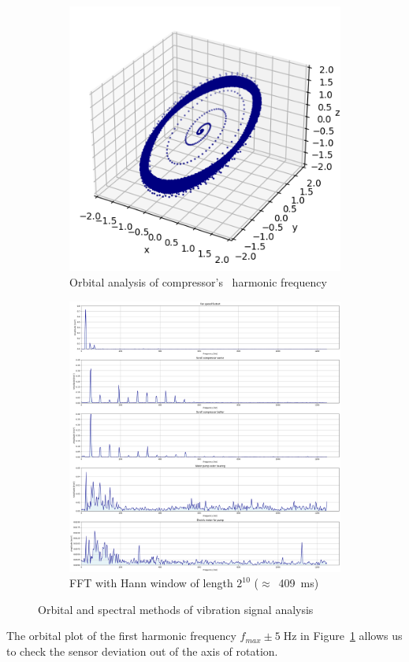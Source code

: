 \begin{figure}[h]
    \centering
    \begin{subfigure}[b]{0.45\textwidth}
        \includegraphics[width=\textwidth]{assets/design/compressor-orbitals-1x.png}
		\caption{Orbital analysis of compressor's ~harmonic frequency}
		\label{fig:design:orbital-analysis}
    \end{subfigure}
    \hfill
    \begin{subfigure}[b]{0.54\textwidth}
        \includegraphics[width=\textwidth]{assets/design/EDA-custom-dataset-spectral-X-axis.png}
        \caption{FFT with Hann window of length $2^{10}$ ($\approx$~409~ms)}
        \label{fig:design:preliminary-spectrum}
    \end{subfigure} 
    \caption{Orbital and spectral methods of vibration signal analysis}
\end{figure}

The orbital plot of the first harmonic frequency $f_{max} \pm 5\;\mathrm{Hz}$ in Figure~\ref{fig:design:orbital-analysis} allows us to check the sensor deviation out of the axis of rotation.
